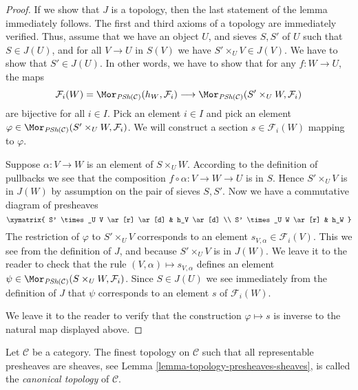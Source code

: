 \begin{proof}
If we show that $J$ is a topology, then the last statement of
the lemma immediately follows. The first and third axioms of
a topology are immediately verified. Thus, assume that
we have an object $U$, and sieves $S, S'$ of $U$
such that $S \in J(U)$, and for all $V \to U$ in $S(V)$
we have $S' \times_U V \in J(V)$. We have to show that
$S' \in J(U)$. In other words, we have to show that for
any $f : W \to U$, the maps
$$
\mathcal{F}_i(W) =
\Mor_{\textit{PSh}(\mathcal{C})}(h_W, \mathcal{F}_i)
\longrightarrow
\Mor_{\textit{PSh}(\mathcal{C})}(S' \times_U W, \mathcal{F}_i)
$$
are bijective for all $i \in I$. Pick an element
$i \in I$ and pick an element
$\varphi \in
\Mor_{\textit{PSh}(\mathcal{C})}(S' \times_U W, \mathcal{F}_i)$.
We will construct a section $s \in \mathcal{F}_i(W)$
mapping to $\varphi$.

\medskip\noindent
Suppose $\alpha : V \to W$ is an element of $S \times_U W$.
According to the definition of pullbacks we see that
the composition $f \circ\alpha : V \to W  \to U$ is in $S$. Hence
$S' \times_U V$ is in $J(W)$ by assumption on the pair
of sieves $S, S'$. Now we have a commutative diagram
of presheaves
$$
\xymatrix{
S' \times_U V \ar[r] \ar[d] & h_V \ar[d] \\
S' \times_U W \ar[r] & h_W
}
$$
The restriction of $\varphi$ to $S' \times_U V$
corresponds to an element $s_{V, \alpha} \in \mathcal{F}_i(V)$.
This we see from the definition of $J$,
and because $S' \times_U V$ is in $J(W)$.
We leave it to the reader to check
that the rule $(V, \alpha) \mapsto s_{V, \alpha}$ defines
an element
$\psi \in
\Mor_{\textit{PSh}(\mathcal{C})}(S \times_U W, \mathcal{F}_i)$.
Since $S \in J(U)$ we see immediately from the definition of $J$
that $\psi$ corresponds to an element $s$ of $\mathcal{F}_i(W)$.

\medskip\noindent
We leave it to the reader to verify that the construction
$\varphi \mapsto s$ is inverse to the natural map displayed above.
\end{proof}

\begin{definition}
\label{definition-canonical-topology}
Let $\mathcal{C}$ be a category.
The finest topology on $\mathcal{C}$ such that
all representable presheaves are sheaves, see
Lemma \ref{lemma-topology-presheaves-sheaves},
is called the {\it canonical topology} of $\mathcal{C}$.
\end{definition}














